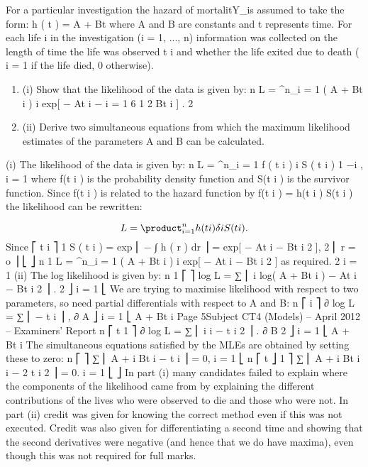 \documentclass[a4paper,12pt]{article}
\begin{document}
For a particular investigation the hazard of mortalitY_is assumed to take the form:
h ( t ) = A + Bt
where A and B are constants and t represents time.
For each life i in the investigation (i = 1, ..., n) information was collected on the
length of time the life was observed t i and whether the life exited due to death ( \delta  i = 1
if the life died, 0 otherwise).
\begin{enumerate}
\item (i)
Show that the likelihood of the data is given by:
n
L = \product^{n}_{i = 1} ( A + Bt i ) \delta  i exp[ − At i −
i = 1
6
1 2
Bt i ] .
2
\item 
(ii) Derive two simultaneous equations from which the maximum likelihood
estimates of the parameters A and B can be calculated.
\end{enumerate}
(i)
The likelihood of the data is given by:
n
L = \product^{n}_{i = 1} f ( t i ) \delta  i S ( t i ) 1 −\delta  i ,
i = 1
where f(t i ) is the probability density function and S(t i ) is the survivor function.
Since f(t i ) is related to the hazard function by
f(t i ) = h(t i ) S(t i )
the likelihood can be rewritten:

\[L = \product^{n}_{i = 1} h ( t i ) \delta  i S ( t i ).\]
Since
⎡ t i
⎤
1
S ( t i ) = exp ⎢ − ∫ h ( r ) dr ⎥ = exp[ − At i − Bt i 2 ],
2
⎢ r = o
⎥
⎣
⎦
n
1
L = \product^{n}_{i = 1} ( A + Bt i ) \delta  i exp[ − At i − Bt i 2 ] as required.
2
i = 1
(ii)
The log likelihood is given by:
n
1
⎡
⎤
log L = ∑ ⎢ \delta  i log( A + Bt i ) − At i − Bt i 2 ⎥ .
2
⎦
i = 1 ⎣
We are trying to maximise likelihood with respect to two parameters,
so need partial differentials with respect to A and B:
n
⎡ \delta  i
⎤
∂
log L = ∑ ⎢
− t i ⎥ ,
∂ A
⎦
i = 1 ⎣ A + Bt i
Page 5Subject CT4 (Models) – April 2012 – Examiners’ Report
n
⎡ \delta  t
1 ⎤
∂
log L = ∑ ⎢ i i − t i 2 ⎥ .
∂ B
2 ⎦
i = 1 ⎣ A + Bt i
The simultaneous equations satisfied by the MLEs are obtained by
setting these to zero:
n
⎡
⎤
\delta 
∑ ⎢ A + i Bt i − t i ⎥ = 0,
i = 1 ⎣
n
⎡ \delta  t
⎦
1
⎤
∑ ⎢ A + i Bt i i − 2 t i 2 ⎥ = 0.
i = 1 ⎣
⎦
In part (i) many candidates failed to explain where the components of the likelihood came
from by explaining the different contributions of the lives who were observed to die and those
who were not. In part (ii) credit was given for knowing the correct method even if this was
not executed. Credit was also given for differentiating a second time and showing that the
second derivatives were negative (and hence that we do have maxima), even though this was
not required for full marks.
\end{document}
